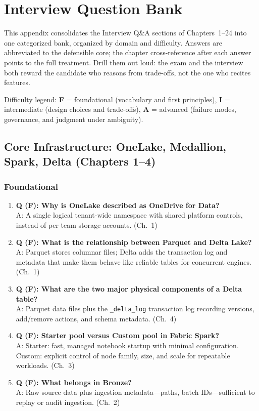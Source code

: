\chapter{Interview Question Bank}
%
This appendix consolidates the Interview Q\&A sections of Chapters~1--24 into one categorized
bank, organized by domain and difficulty. Answers are abbreviated to the defensible core; the
chapter cross-reference after each answer points to the full treatment. Drill them out loud:
the exam and the interview both reward the candidate who reasons from trade-offs, not the one
who recites features.

\begin{tipbox}
Difficulty legend: \textbf{F} = foundational (vocabulary and first principles), \textbf{I} =
intermediate (design choices and trade-offs), \textbf{A} = advanced (failure modes, governance,
and judgment under ambiguity).
\end{tipbox}

\section{Core Infrastructure: OneLake, Medallion, Spark, Delta (Chapters 1--4)}

\subsection*{Foundational}
\begin{enumerate}
    \item \textbf{Q (F): Why is OneLake described as OneDrive for Data?}\\
    A: A single logical tenant-wide namespace with shared platform controls, instead of
    per-team storage accounts. (Ch.~1)
    \item \textbf{Q (F): What is the relationship between Parquet and Delta Lake?}\\
    A: Parquet stores columnar files; Delta adds the transaction log and metadata that make
    them behave like reliable tables for concurrent engines. (Ch.~1)
    \item \textbf{Q (F): What are the two major physical components of a Delta table?}\\
    A: Parquet data files plus the \texttt{\_delta\_log} transaction log recording versions,
    add/remove actions, and schema metadata. (Ch.~4)
    \item \textbf{Q (F): Starter pool versus Custom pool in Fabric Spark?}\\
    A: Starter: fast, managed notebook startup with minimal configuration. Custom: explicit
    control of node family, size, and scale for repeatable workloads. (Ch.~3)
    \item \textbf{Q (F): What belongs in Bronze?}\\
    A: Raw source data plus ingestion metadata---paths, batch IDs---sufficient to replay or
    audit ingestion. (Ch.~2)
\end{enumerate}

